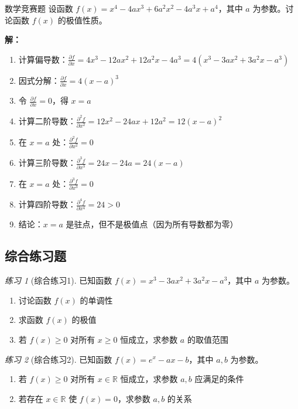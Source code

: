 \documentclass[a4paper,11pt]{ctexart}
\newcommand{\partialder}[2]{\frac{\partial #1}{\partial #2}}
\theoremstyle{definition}
\theoremstyle{remark}
\newtheorem{exercise}{练习}[section]
\begin{document}
\begin{examplebox}{数学竞赛题}
设函数 $f(x) = x^4 - 4ax^3 + 6a^2x^2 - 4a^3x + a^4$，其中 $a$ 为参数。讨论函数 $f(x)$ 的极值性质。

\textbf{解：}
\begin{enumerate}
    \item 计算偏导数：$\partialder{f}{x} = 4x^3 - 12ax^2 + 12a^2x - 4a^3 = 4(x^3 - 3ax^2 + 3a^2x - a^3)$
    \item 因式分解：$\partialder{f}{x} = 4(x-a)^3$
    \item 令 $\partialder{f}{x} = 0$，得 $x = a$
    \item 计算二阶导数：$\frac{\partial^2 f}{\partial x^2} = 12x^2 - 24ax + 12a^2 = 12(x-a)^2$
    \item 在 $x = a$ 处：$\frac{\partial^2 f}{\partial x^2} = 0$
    \item 计算三阶导数：$\frac{\partial^3 f}{\partial x^3} = 24x - 24a = 24(x-a)$
    \item 在 $x = a$ 处：$\frac{\partial^3 f}{\partial x^3} = 0$
    \item 计算四阶导数：$\frac{\partial^4 f}{\partial x^4} = 24 > 0$
    \item 结论：$x = a$ 是驻点，但不是极值点（因为所有导数都为零）
\end{enumerate}
\end{examplebox}

\subsection{综合练习题}

\begin{exercise}[综合练习1]
已知函数 $f(x) = x^3 - 3ax^2 + 3a^2x - a^3$，其中 $a$ 为参数。
\begin{enumerate}
    \item 讨论函数 $f(x)$ 的单调性
    \item 求函数 $f(x)$ 的极值
    \item 若 $f(x) \geq 0$ 对所有 $x \geq 0$ 恒成立，求参数 $a$ 的取值范围
\end{enumerate}
\end{exercise}

\begin{exercise}[综合练习2]
已知函数 $f(x) = e^x - ax - b$，其中 $a, b$ 为参数。
\begin{enumerate}
    \item 若 $f(x) \geq 0$ 对所有 $x \in \mathbb{R}$ 恒成立，求参数 $a, b$ 应满足的条件
    \item 若存在 $x \in \mathbb{R}$ 使 $f(x) = 0$，求参数 $a, b$ 的关系
\end{enumerate}
\end{exercise}
\end{document}
